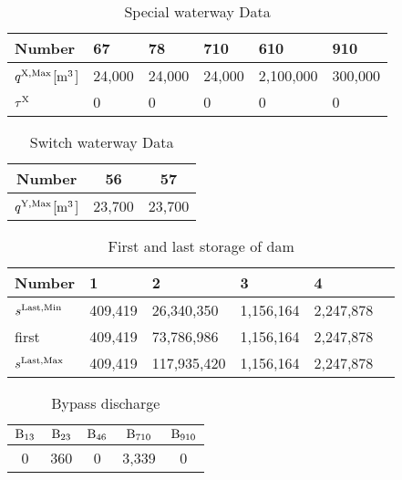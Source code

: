 \begin{table}[htbp]
\begin{center}
\caption{Special waterway Data}
\label{way}
\begin{tabular}{llllll}
\hline
Number & 67 & 78 & 710 & 610 & 910\\ \hline
$q^{\rm X,Max}$[$ \rm {m^3}$] & 24,000 & 24,000 & 24,000 & 2,100,000 & 300,000 \\
$\tau^{\rm X}$& 0 & 0 & 0 & 0 & 0 \\
\hline
\end{tabular}
\end{center}
\end{table}

\begin{table}[htbp]
\begin{center}
\caption{Switch waterway Data}
\label{switch}
\label{table:way2}
\begin{tabular}{ccc}
\hline
Number & 56 & 57 \\ \hline
$q^{\rm Y,Max}$[$ \rm {m^3}$] & 23,700 & 23,700 \\
\hline
\end{tabular}
\end{center}
\end{table}

\begin{table}[htbp]
\begin{center}
\caption{First and last storage of dam}
\label{storage2}
\begin{tabular}{llllll}
\hline
Number & 1 & 2 & 3 & 4\\
\hline \hline
$s^{\rm Last,Min}$ & 409,419 & 26,340,350 & 1,156,164 & 2,247,878\\
first & 409,419 & 73,786,986 & 1,156,164 & 2,247,878 \\
$s^{\rm Last,Max}$ & 409,419 & 117,935,420 & 1,156,164 & 2,247,878\\
\hline
\end{tabular}
\label{storage}
\end{center}
\end{table}

\begin{table}[htbp]
\begin{center}
\caption{Bypass discharge}
\label{bypass}
\begin{tabular}{ccccc}
\hline
$\rm B_{13}$ & $\rm B_{23}$ & $\rm B_{46}$ & $\rm B_{710}$ & $\rm B_{910}$ \\
\hline
\hline
0 & 360 & 0 & 3,339 & 0\\
\hline
\end{tabular}
\end{center}
\end{table}

